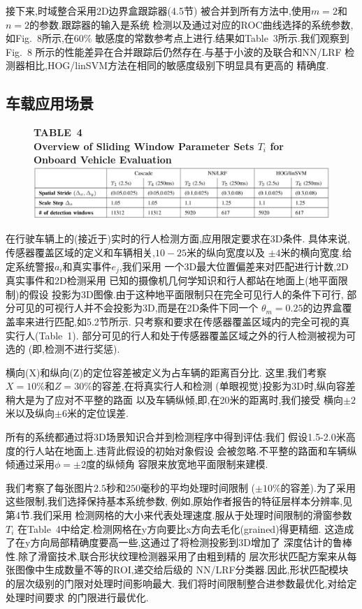 \documentclass[10pt,letterpaper,journal,compsoc]{IEEEtran}
\begin{document}
接下来,时域整合采用2D边界盒跟踪器(4.5节)
被合并到所有方法中,使用$m=2$和$n=2$的参数.跟踪器的输入是系统
检测以及通过对应的ROC曲线选择的系统参数,如Fig.~8所示,在60\%
敏感度的常数参考点上进行.结果如Table~3所示.我们观察到Fig.~8
所示的性能差异在合并跟踪后仍然存在.与基于小波的及联合和NN/LRF
检测器相比,HOG/linSVM方法在相同的敏感度级别下明显具有更高的
精确度.
\subsection{车载应用场景}
\begin{figure}[!b]
\centering
\large{\textbf{TABLE~4\\
Overview of Sliding Window Parameter Sets $T_i$ for Onboard Vehicle Evaluation
}}
\includegraphics[width=7in]{table4.JPG}
\end{figure}
在行驶车辆上的(接近于)实时的行人检测方面,应用限定要求在3D条件.
具体来说,传感器覆盖区域的定义和车辆相关,$10-25$米的纵向宽度以及
$\pm4$米的横向宽度.给定系统警报$a_i$和真实事件$e_j$,我们采用
一个3D最大位置偏差来对匹配进行计数,2D真实事件和2D检测采用
已知的摄像机几何学知识和行人都站在地面上(地平面限制)的假设
投影为3D图像.由于这种地平面限制只在完全可见行人的条件下可行,
部分可见的可视行人并不会投影为3D,而是在2D条件下同一个
$\theta_m=0.25$的边界盒覆盖率来进行匹配,如5.2节所示.
只考察和要求在传感器覆盖区域内的完全可视的真实行人(Table~1).
部分可见的行人和处于传感器覆盖区域之外的行人检测被视为可选的
(即,检测不进行奖惩).

横向(X)和纵向(Z)的定位容差被定义为占车辆的距离百分比.
这里,我们考察$X=10\%$和$Z=30\%$的容差,在将真实行人和检测
(单眼视觉)投影为3D时,纵向容差稍大是为了应对不平整的路面
以及车辆纵倾,即,在20米的距离时,我们接受
横向$\pm2$米以及纵向$\pm6$米的定位误差.

所有的系统都通过将3D场景知识合并到检测程序中得到评估:我们
假设1.5-2.0米高度的行人站在地面上.违背此假设的初始对象假设
会被忽略.不平整的路面和车辆纵倾通过采用$\phi=\pm2$度的纵倾角
容限来放宽地平面限制来建模.

我们考察了每张图片$2.5$秒和$250$毫秒的平均处理时间限制
($\pm10\%$的容差).为了采用这些限制,我们选择保持基本系统参数,
例如,原始作者报告的特征层样本分辨率,见第4节.我们采用
检测网格的大小来代表处理速度.服从于处理时间限制的滑窗参数$T_i$
在Table~4中给定.检测网格在y方向要比x方向去毛化(grained)得更精细.
这造成了在y方向局部精确度要高一些,这通过了将检测投影到3D增加了
深度估计的鲁棒性.除了滑窗技术,联合形状纹理检测器采用了由粗到精的
层次形状匹配方案来从每张图像中生成数量不等的ROI,递交给后级的
NN/LRF分类器.因此,形状匹配模块的层次级别的门限对处理时间影响最大.
我们将时间限制整合进参数最优化\cite{bib23},对给定处理时间要求
的门限进行最优化.
\end{document}
